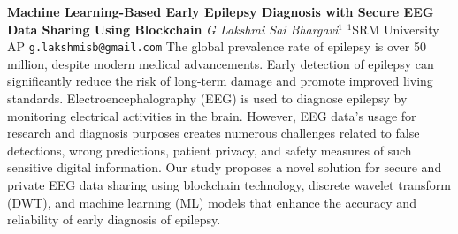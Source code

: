 
    \begin{conf-abstract}[]
        {\textbf{Machine Learning-Based Early Epilepsy Diagnosis with Secure EEG Data Sharing Using Blockchain}}
        {\textit{G Lakshmi Sai  Bhargavi$^{1}$}}
        {$^{1}$SRM University AP}
        {\texttt{g.lakshmisb@gmail.com}}
        {The global prevalence rate of epilepsy is over 50 million, despite modern medical advancements. Early detection of epilepsy can significantly reduce the risk of long-term damage and promote improved living standards. Electroencephalography (EEG) is used to diagnose epilepsy by monitoring electrical activities in the brain. However, EEG data's usage for research and diagnosis purposes creates numerous challenges related to false detections, wrong predictions, patient privacy, and safety measures of such sensitive digital information. Our study proposes a novel solution for secure and private EEG data sharing using blockchain technology, discrete wavelet transform (DWT), and machine learning (ML) models that enhance the accuracy and reliability of early diagnosis of epilepsy. }
    \end{conf-abstract}
        